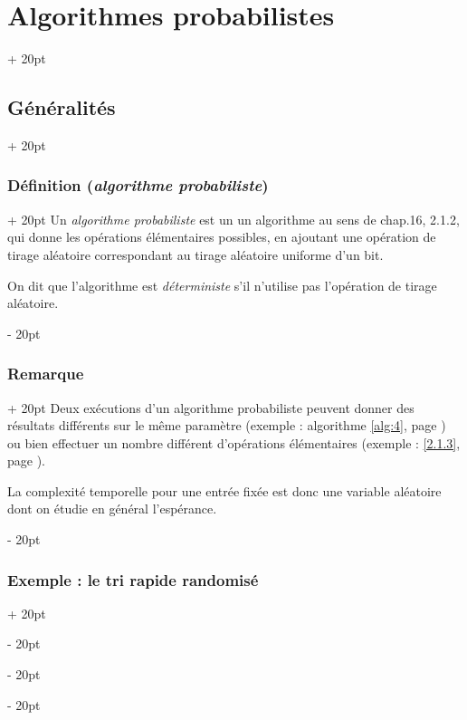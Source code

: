 \documentclass[a4paper, 12pt, twoside]{article}
\newcommand{\ind}[1][20pt]{\advance\leftskip + #1}
\newcommand{\deind}[1][20pt]{\advance\leftskip - #1}
\newenvironment{indt}[2][20pt]{#2 \par \ind[#1]}{\par \deind} %
\newcommand{\1}{\mathbbm 1}
\begin{document}
    \vspace{12pt}
    
    \vspace{12pt}
    
    \begin{indt}{\section{Algorithmes probabilistes}}
        \begin{indt}{\subsection{Généralités}}
            \begin{indt}{\subsubsection{Définition (\textit{algorithme probabiliste})}}
                Un \emph{algorithme probabiliste} est un un algorithme au sens de chap.16, 2.1.2, qui donne les opérations élémentaires possibles, en ajoutant une opération de tirage aléatoire correspondant au tirage aléatoire uniforme d'un bit.

                On dit que l'algorithme est \emph{déterministe} s'il n'utilise pas l'opération de tirage aléatoire.
            \end{indt}

            \vspace{12pt}
            
            \begin{indt}{\subsubsection{Remarque}}
                Deux exécutions d'un algorithme probabiliste peuvent donner des résultats différents sur le même paramètre (exemple : algorithme \ref{alg:4}, page \pageref{alg:4}) ou bien effectuer un nombre différent d'opérations élémentaires (exemple : \ref{2.1.3}, page \pageref{2.1.3}).

                La complexité temporelle pour une entrée fixée est donc une variable aléatoire dont on étudie en général l'espérance.
            \end{indt}

            \vspace{12pt}
            
            \begin{indt}{\subsubsection{Exemple : le tri rapide randomisé}}
                \label{2.1.3}


\end{indt}
\end{indt}
\end{indt}
\end{document}
